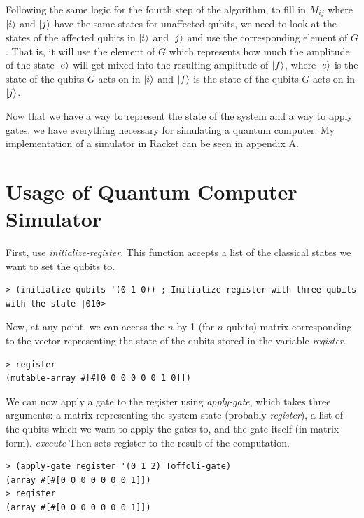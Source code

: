 \documentclass[11pt]{report}
\newcommand{\?}{\stackrel{?}{=}}
\begin{document}
Following the same logic for the fourth step of the algorithm, to fill in $M_{ij}$ where $\ket{i}$ and $\ket{j}$ have the same states for unaffected qubits, we need to look at the states of the affected qubits in $\ket{i}$ and $\ket{j}$ and use the corresponding element of $G$. That is, it will use the element of $G$ which represents how much the amplitude of the state $\ket{e}$ will get mixed into the resulting amplitude of $\ket{f}$, where $\ket{e}$ is the state of the qubits $G$ acts on in $\ket{i}$ and $\ket{f}$ is the state of the qubits $G$ acts on in $\ket{j}$.

Now that we have a way to represent the state of the system and a way to apply gates, we have everything necessary for simulating a quantum computer. My implementation of a simulator in Racket can be seen in appendix A.

\section{Usage of Quantum Computer Simulator}

First, use \textit{initialize-register}. This function accepts a list of the classical states we want to set the qubits to.

\begin{lstlisting}
> (initialize-qubits '(0 1 0)) ; Initialize register with three qubits with the state |010>
\end{lstlisting}

Now, at any point, we can access the $n$ by 1 (for $n$ qubits) matrix corresponding to the vector representing the state of the qubits stored in the variable \textit{register}.

\begin{lstlisting}
> register
(mutable-array #[#[0 0 0 0 0 0 1 0]])
\end{lstlisting}

We can now apply a gate to the register using \textit{apply-gate}, which takes three arguments: a matrix representing the system-state (probably \textit{register}), a list of the qubits which we want to apply the gates to, and the gate itself (in matrix form). \textit{execute} Then sets register to the result of the computation.

\begin{lstlisting}
> (apply-gate register '(0 1 2) Toffoli-gate)
(array #[#[0 0 0 0 0 0 0 1]])
> register
(array #[#[0 0 0 0 0 0 0 1]])
\end{lstlisting}
\end{document}

